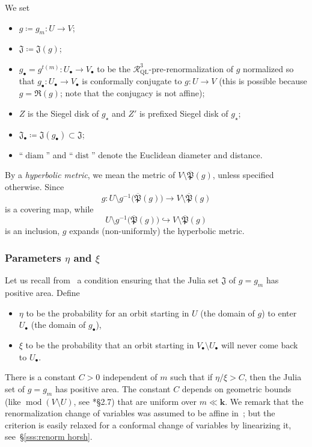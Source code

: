 \documentclass{amsart}
\newcommand{\1}{{\mathbb 1 }}
\newcommand\RRR{{\mathfrak R}}
\newcommand\RR{\mathcal{R}}
\newcommand\Jul{{\mathfrak J}}
\newcommand\ovPost{{\overline{\mathfrak P}}}
\newcommand{\bbk}{{\mathbf k}}
\newcommand{\str}{{\star}}
\theoremstyle{remark}
\numberwithin{equation}{section}
\theoremstyle{definition}
\def\QL{{\text{QL}}}
\newcommand{\diam}{\operatorname{diam}}
\newcommand{\dist}{\operatorname{dist}}
\renewcommand{\mod}{\operatorname{mod}}
\theoremstyle{nonumberbreak}
\begin{document}
We set 
\begin{itemize}
\item $g \coloneqq g_m \colon U\to V$;
\item $\Jul \coloneqq \Jul(g)$;
\item $g_\bullet=g^{t(m)}\colon U_\bullet \to V_\bullet$ to be the $\RR_\QL^3$-pre-renormalization of $g$ normalized so that $g_\bullet\colon U_\bullet \to V_\bullet$ is conformally conjugate to $g\colon U\to V$ (this is possible because $g=\RRR( g)$; note that the conjugacy is not affine);
\item $Z$ is the Siegel disk of $g_\str$ and $Z'$ is prefixed Siegel disk of $g_\str$;
\item $\Jul _\bullet\coloneqq \Jul (g_\bullet)\subset \Jul$;
\item ``$\diam$'' and ``$\dist$'' denote the Euclidean diameter and distance.
\end{itemize}



By a \emph{hyperbolic metric}, we mean the metric of $V\setminus \ovPost(g)$, unless specified otherwise. Since \[g\colon U\setminus g^{-1}\big(\ovPost(g)\big)\to V\setminus \ovPost(g)\]
is a covering map, while
 \[ U\setminus g^{-1}\big(\ovPost(g)\big)\hookrightarrow  V\setminus \ovPost(g)\]
 is an inclusion, $g$ expands (non-uniformly) the hyperbolic metric.




\subsubsection{Parameters $\eta$ and $\xi$}
 Let us recall from~\cite{AL-AMS} a condition ensuring that the Julia set $\Jul$ of $g=g_m$ has positive area. Define
\begin{itemize}
\item $\eta$ to be the probability for an orbit starting in $U$ (the domain of $g$) to enter $U_\bullet$ (the domain of $g_\bullet$),
\item $\xi$ to be the probability that an orbit starting in $V_\bullet \setminus U_\bullet$ will never come back to $U_\bullet$.
\end{itemize}



There is a constant $C>0$ independent of $m$ such that if $\eta/\xi>C$, then the Julia set of $g=g_m$ has positive area. The constant $C$ depends on geometric bounds (like $\mod (V\setminus U)$, see \cite{AL-AMS}*{\S 2.7}) that are uniform over $m\ll \bbk$. We remark that the renormalization change of variables was assumed to be affine in~\cite{AL-AMS}; but the criterion is easily relaxed for a conformal change of variables by linearizing it, see~\S\ref{sss:renorm horsh}.
\end{document}
